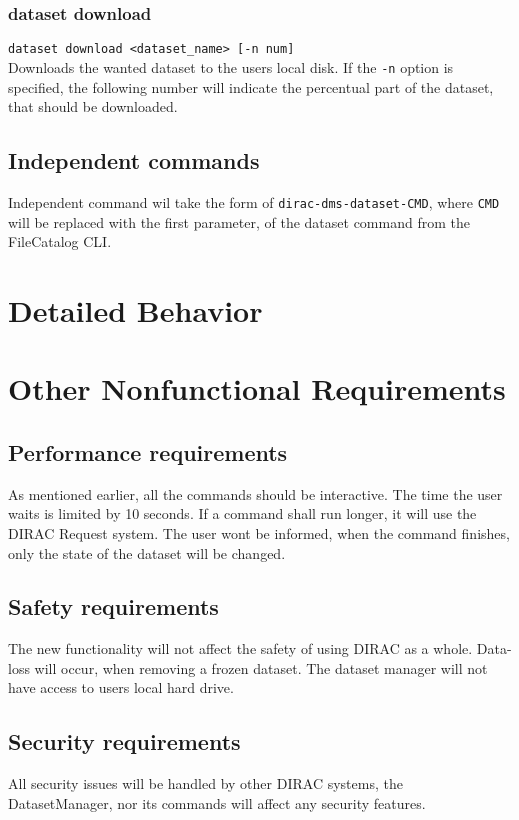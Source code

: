 \documentclass{scrreprt}
\begin{document}
\subsection{dataset download}
\texttt{dataset download <dataset_name> [-n num]} \\
Downloads the wanted dataset to the users local disk. If the \texttt{-n} option is specified, the following number will indicate the percentual part of the dataset, that should be downloaded.


\section{Independent commands}
Independent command wil take the form of \texttt{dirac-dms-dataset-CMD}, where \texttt{CMD} will be replaced with the first parameter, of the dataset command from the FileCatalog CLI. 



\chapter{Detailed Behavior} \label{chap:Details}



\chapter{Other Nonfunctional Requirements}


\section{Performance requirements} \label{sec:Performance}
As mentioned earlier, all the commands should be interactive. The time the user waits is limited by 10 seconds. If a command shall run longer, it will use the DIRAC Request system. The user wont be informed, when the command finishes, only the state of the dataset will be changed.


\section{Safety requirements}
The new functionality will not affect the safety of using DIRAC as a whole. Data-loss will occur, when removing a frozen dataset. The dataset manager will not have access to users local hard drive.


\section{Security requirements}
All security issues will be handled by other DIRAC systems, the DatasetManager, nor its commands will affect any security features. 
\end{document}

